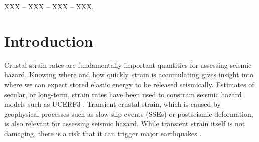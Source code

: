 \documentclass[extra,mreferee]{gji}
\begin{document}
\begin{keywords}
 XXX -- XXX -- XXX -- XXX.
\end{keywords}

\section{Introduction}\label{sec:Introduction}


Crustal strain rates are fundamentally important quantities for
assessing seismic hazard. Knowing where and how quickly strain is
accumulating gives insight into where we can expect stored elastic
energy to be released seismically. Estimates of secular, or long-term,
strain rates have been used to constrain seismic hazard models such as
UCERF3 \citep{Field2014}. Transient crustal strain, which is caused by
geophysical processes such as slow slip events (SSEs) or postseismic
deformation, is also relevant for assessing seismic hazard. While
transient strain itself is not damaging, there is a risk that it can
trigger major earthquakes \citep{Roeloffs2006,Freed2001}.

\end{document}
